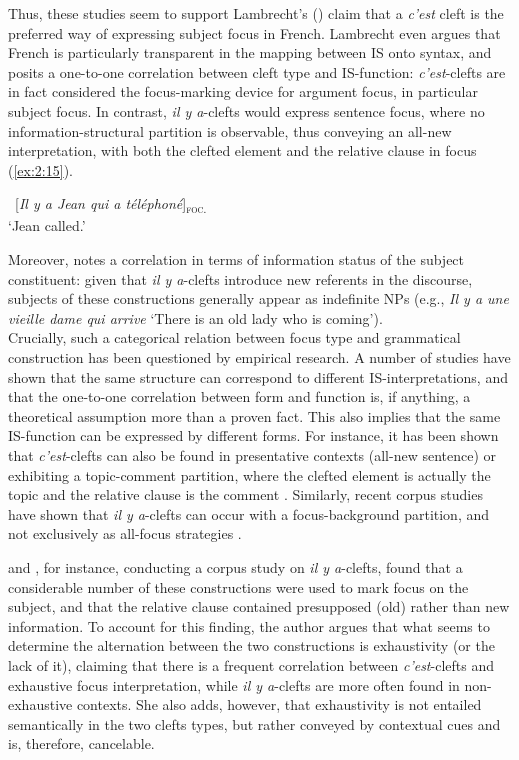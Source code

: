 Thus, these studies seem to support Lambrecht’s (\citeyear{lambrecht1996information}) claim  that a \textit{c’est} cleft is the preferred way of expressing subject focus in French.
Lambrecht even argues that French is particularly transparent in the mapping between IS onto syntax, and posits a one-to-one correlation between cleft type and IS-function: \textit{c’est}-clefts are in fact considered the focus-marking device for argument focus, in particular subject focus. In contrast, \textit{il y a}-clefts would express sentence focus, where no information-structural partition is observable, thus conveying an all-new interpretation, with both the clefted element and the relative clause in focus (\ref{ex:2:15}).

\ea \label{ex:2:15}
 \ {[\textit{Il y a Jean qui a téléphoné}]\textsubscript{\textsc{foc.}}}\normalsize\\
`Jean called.' \hfill \parencite[136]{lambrecht1988presentational}
\z


Moreover, \textcite{lambrecht2010constraints} notes a correlation in terms of information status of the subject constituent: given that \textit{il y a}-clefts introduce new referents in the discourse, subjects of these constructions generally appear as indefinite NPs (e.g., \textit{Il y a une vieille dame qui arrive} `There is an old lady who is coming'). \\
Crucially, such a categorical relation between focus type and grammatical construction has been questioned by empirical research. A number of studies have shown that the same structure can correspond to different IS-interpretations, and that the one-to-one correlation between form and function is, if anything, a theoretical assumption more than a proven fact. This also implies that the same IS-function can be expressed by different forms. For instance, it has been shown that \textit{c’est}-clefts can also be found in presentative contexts (all-new sentence) or exhibiting a topic-comment partition, where the clefted element is actually the topic and the relative clause is the comment \parencite{dufter2009clefting}.
Similarly, recent corpus studies have shown that \textit{il y a}-clefts can occur with a focus-background partition, and not exclusively as all-focus strategies \parencite{skopeteas2010focus, karssenberg2017oiseaux, Karssenberg+2018}. 

\textcite{karssenberg2017oiseaux} and \textcite{Karssenberg+2018}, for instance, conducting a corpus study on \textit{il y a}-clefts, found that a considerable number of these constructions were used to mark focus on the subject, and that the relative clause contained presupposed (old) rather than new information.
To account for this finding, the author argues that what seems to determine the alternation between the two constructions is exhaustivity (or the lack of it), claiming that there is a frequent correlation between \textit{c’est}-clefts and exhaustive focus interpretation, while \textit{il y a}-clefts are more often found in non-exhaustive contexts. She also adds, however, that exhaustivity is not entailed semantically in the two clefts types, but rather conveyed by contextual cues and is, therefore, cancelable.

